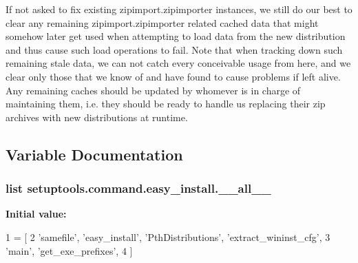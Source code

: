 \begin{DoxyVerb}
If not asked to fix existing zipimport.zipimporter instances, we still do
our best to clear any remaining zipimport.zipimporter related cached data
that might somehow later get used when attempting to load data from the new
distribution and thus cause such load operations to fail. Note that when
tracking down such remaining stale data, we can not catch every conceivable
usage from here, and we clear only those that we know of and have found to
cause problems if left alive. Any remaining caches should be updated by
whomever is in charge of maintaining them, i.e. they should be ready to
handle us replacing their zip archives with new distributions at runtime.\end{DoxyVerb}
 

\subsection{Variable Documentation}
\hypertarget{namespacesetuptools_1_1command_1_1easy__install_a975283f0ff0f649e3be83d3476fe462f}{}
\subsubsection[{\+\_\+\+\_\+all\+\_\+\+\_\+}]{\setlength{\rightskip}{0pt plus 5cm}list setuptools.\+command.\+easy\+\_\+install.\+\_\+\+\_\+all\+\_\+\+\_\+}\label{namespacesetuptools_1_1command_1_1easy__install_a975283f0ff0f649e3be83d3476fe462f}
{\bfseries Initial value\+:}
\begin{DoxyCode}
1 = [
2     \textcolor{stringliteral}{'samefile'}, \textcolor{stringliteral}{'easy\_install'}, \textcolor{stringliteral}{'PthDistributions'}, \textcolor{stringliteral}{'extract\_wininst\_cfg'},
3     \textcolor{stringliteral}{'main'}, \textcolor{stringliteral}{'get\_exe\_prefixes'},
4 ]
\end{DoxyCode}
\hypertarget{namespacesetuptools_1_1command_1_1easy__install_aa9f7d6a38e2d4a1ad18d11a1e978de2b}{}
